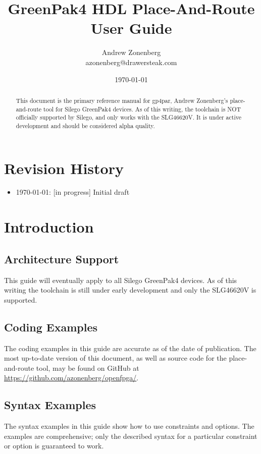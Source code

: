 \documentclass{article}
\begin{document}
\title{GreenPak4 HDL Place-And-Route User Guide}
\author{Andrew Zonenberg\\
azonenberg@drawersteak.com}
\date{\today}
\maketitle

\begin{abstract}
This document is the primary reference manual for gp4par, Andrew Zonenberg's place-and-route tool for Silego 
GreenPak4 devices. As of this writing, the toolchain is NOT officially supported by Silego, and only works with the 
SLG46620V. It is under active development and should be considered alpha quality.
\end{abstract}

\pagebreak

\tableofcontents

\pagebreak
\section{Revision History}
\begin{itemize}
\item \today: [in progress] Initial draft
\end{itemize}

\pagebreak
\section{Introduction}

\subsection{Architecture Support}
This guide will eventually apply to all Silego GreenPak4 devices. As of this writing the toolchain is still under early
development and only the SLG46620V is supported.

\subsection{Coding Examples}
The coding examples in this guide are accurate as of the date of publication. The most up-to-date version of this 
document, as well as source code for the place-and-route tool, may be found on GitHub at 
\url{https://github.com/azonenberg/openfpga/}.

\subsection{Syntax Examples}
The syntax examples in this guide show how to use constraints and options. The examples are comprehensive; only the 
described syntax for a particular constraint or option is guaranteed to work.
\end{document}
